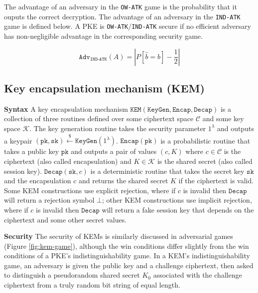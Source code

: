 \documentclass[journal=tches,submission]{iacrtrans}
\newcommand{\keygen}{\texttt{KeyGen}}
\newcommand{\kem}{\texttt{KEM}}
\newcommand{\encap}{\texttt{Encap}}
\newcommand{\decap}{\texttt{Decap}}
\newcommand{\pk}{\texttt{pk}}
\newcommand{\sk}{\texttt{sk}}
\newcommand{\leftsample}{\stackrel{\$}{\leftarrow}}
\begin{document}
The advantage of an adversary in the \texttt{OW-ATK} game is the probability that it ouputs the correct decryption. The advantage of an adversary in the \texttt{IND-ATK} game is defined below. A PKE is \texttt{OW-ATK}/\texttt{IND-ATK} secure if no efficient adversary has non-negligible advantage in the corresponding security game.

\begin{equation*}
    \texttt{Adv}_\texttt{IND-ATK}(A) = \left\vert P\left[ \hat{b} = b \right] - \frac{1}{2} \right\vert
\end{equation*}

\subsection{Key encapsulation mechanism (KEM)}
\textbf{Syntax} A key encapsulation mechanism $\kem(\keygen, \encap, \decap)$ is a collection of three routines defined over some ciphertext space $\mathcal{C}$ and some key space $\mathcal{K}$. The key generation routine takes the security parameter $1^\lambda$ and outputs a keypair $(\pk, \sk) \leftsample \keygen(1^\lambda)$. $\encap(\pk)$ is a probabilistic routine that takes a public key $\pk$ and outputs a pair of values $(c, K)$ where $c \in \mathcal{C}$ is the ciphertext (also called encapsulation) and $K \in \mathcal{K}$ is the shared secret (also called session key). $\decap(\sk, c)$ is a deterministic routine that takes the secret key $\sk$ and the encapsulation $c$ and returns the shared secret $K$ if the ciphertext is valid. Some KEM constructions use explicit rejection, where if $c$ is invalid then $\decap$ will return a rejection symbol $\bot$; other KEM constructions use implicit rejection, where if $c$ is invalid then $\decap$ will return a fake session key that depends on the ciphertext and some other secret values.

\textbf{Security} The security of KEMs is similarly discussed in adversarial games (Figure \ref{fig:kem-game}), although the win conditions differ slightly from the win conditions of a PKE's indistinguishability game. In a KEM's indistinguishability game, an adversary is given the public key and a challenge ciphertext, then asked to distinguish a pseudorandom shared secret $K_0$ associated with the challenge ciphertext from a truly random bit string of equal length.
\end{document}
